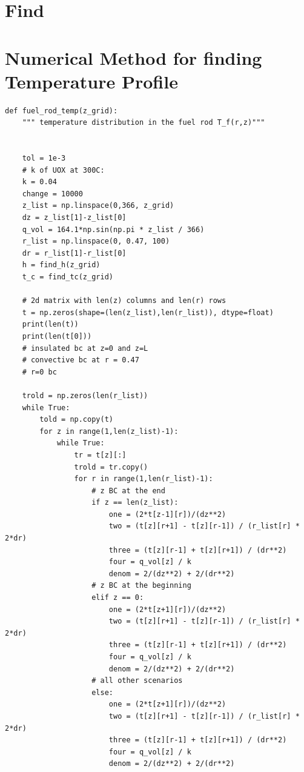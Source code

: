 \documentclass[12pt,letterpaper]{article}
\begin{document}
\begin{appendices}
\section{Find}

\section{Numerical Method for finding Temperature Profile}
\begin{verbatim}
def fuel_rod_temp(z_grid):
    """ temperature distribution in the fuel rod T_f(r,z)"""


    tol = 1e-3
    # k of UOX at 300C:
    k = 0.04 
    change = 10000
    z_list = np.linspace(0,366, z_grid)
    dz = z_list[1]-z_list[0]
    q_vol = 164.1*np.sin(np.pi * z_list / 366)
    r_list = np.linspace(0, 0.47, 100)
    dr = r_list[1]-r_list[0]
    h = find_h(z_grid)
    t_c = find_tc(z_grid)

    # 2d matrix with len(z) columns and len(r) rows
    t = np.zeros(shape=(len(z_list),len(r_list)), dtype=float)
    print(len(t))
    print(len(t[0]))
    # insulated bc at z=0 and z=L
    # convective bc at r = 0.47
    # r=0 bc

    trold = np.zeros(len(r_list))
    while True:
        told = np.copy(t)
        for z in range(1,len(z_list)-1):
            while True:
                tr = t[z][:]
                trold = tr.copy()
                for r in range(1,len(r_list)-1):
                    # z BC at the end
                    if z == len(z_list):
                        one = (2*t[z-1][r])/(dz**2)
                        two = (t[z][r+1] - t[z][r-1]) / (r_list[r] * 2*dr)
                        three = (t[z][r-1] + t[z][r+1]) / (dr**2)
                        four = q_vol[z] / k
                        denom = 2/(dz**2) + 2/(dr**2) 
                    # z BC at the beginning
                    elif z == 0:
                        one = (2*t[z+1][r])/(dz**2)
                        two = (t[z][r+1] - t[z][r-1]) / (r_list[r] * 2*dr)
                        three = (t[z][r-1] + t[z][r+1]) / (dr**2)
                        four = q_vol[z] / k
                        denom = 2/(dz**2) + 2/(dr**2) 
                    # all other scenarios
                    else:
                        one = (2*t[z+1][r])/(dz**2)
                        two = (t[z][r+1] - t[z][r-1]) / (r_list[r] * 2*dr)
                        three = (t[z][r-1] + t[z][r+1]) / (dr**2)
                        four = q_vol[z] / k
                        denom = 2/(dz**2) + 2/(dr**2) 


\end{verbatim}
\end{appendices}
\end{document}
